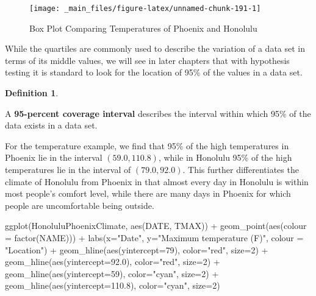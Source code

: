 \documentclass[
]{book}
\newenvironment{Shaded}{\begin{snugshade}}{\end{snugshade}}
\newcommand{\AttributeTok}[1]{\textcolor[rgb]{0.77,0.63,0.00}{#1}}
\newcommand{\DecValTok}[1]{\textcolor[rgb]{0.00,0.00,0.81}{#1}}
\newcommand{\FloatTok}[1]{\textcolor[rgb]{0.00,0.00,0.81}{#1}}
\newcommand{\FunctionTok}[1]{\textcolor[rgb]{0.00,0.00,0.00}{#1}}
\newcommand{\NormalTok}[1]{#1}
\newcommand{\SpecialCharTok}[1]{\textcolor[rgb]{0.00,0.00,0.00}{#1}}
\newcommand{\StringTok}[1]{\textcolor[rgb]{0.31,0.60,0.02}{#1}}
\theoremstyle{definition}
\newtheorem{definition}{Definition}[chapter]
\theoremstyle{definition}
\theoremstyle{definition}
\theoremstyle{definition}
\theoremstyle{remark}
\begin{document}
\begin{figure}

{\centering \texttt{[image: \_main\_files/figure-latex/unnamed-chunk-191-1]} 

}

\caption{Box Plot Comparing Temperatures of Phoenix and Honolulu}\label{fig:unnamed-chunk-191}
\end{figure}

While the quartiles are commonly used to describe the variation of a data set in terms of its middle values, we will see in later chapters that with hypothesis testing it is standard to look for the location of 95\% of the values in a data set.

\begin{definition}
\protect\hypertarget{def:unlabeled-div-299}{}\label{def:unlabeled-div-299}

A \textbf{95-percent coverage interval} describes the interval within which 95\% of the data exists in a data set.

\end{definition}

For the temperature example, we find that 95\% of the high temperatures in Phoenix lie in the interval \((59.0, 110.8)\), while in Honolulu 95\% of the high temperatures lie in the interval of \((79.0,92.0)\). This further differentiates the climate of Honolulu from Phoenix in that almost every day in Honolulu is within most people's comfort level, while there are many days in Phoenix for which people are uncomfortable being outside.

\begin{Shaded}
\begin{Highlighting}[]
\FunctionTok{ggplot}\NormalTok{(HonoluluPhoenixClimate, }\FunctionTok{aes}\NormalTok{(DATE, TMAX)) }\SpecialCharTok{+} \FunctionTok{geom\_point}\NormalTok{(}\FunctionTok{aes}\NormalTok{(}\AttributeTok{colour =} \FunctionTok{factor}\NormalTok{(NAME))) }\SpecialCharTok{+} \FunctionTok{labs}\NormalTok{(}\AttributeTok{x=}\StringTok{"Date"}\NormalTok{, }\AttributeTok{y=}\StringTok{"Maximum temperature (F)"}\NormalTok{, }\AttributeTok{colour =} \StringTok{"Location"}\NormalTok{) }\SpecialCharTok{+} \FunctionTok{geom\_hline}\NormalTok{(}\FunctionTok{aes}\NormalTok{(}\AttributeTok{yintercept=}\DecValTok{79}\NormalTok{), }\AttributeTok{color=}\StringTok{"red"}\NormalTok{, }\AttributeTok{size=}\DecValTok{2}\NormalTok{) }\SpecialCharTok{+} \FunctionTok{geom\_hline}\NormalTok{(}\FunctionTok{aes}\NormalTok{(}\AttributeTok{yintercept=}\FloatTok{92.0}\NormalTok{), }\AttributeTok{color=}\StringTok{"red"}\NormalTok{, }\AttributeTok{size=}\DecValTok{2}\NormalTok{) }\SpecialCharTok{+} \FunctionTok{geom\_hline}\NormalTok{(}\FunctionTok{aes}\NormalTok{(}\AttributeTok{yintercept=}\DecValTok{59}\NormalTok{), }\AttributeTok{color=}\StringTok{"cyan"}\NormalTok{, }\AttributeTok{size=}\DecValTok{2}\NormalTok{) }\SpecialCharTok{+} \FunctionTok{geom\_hline}\NormalTok{(}\FunctionTok{aes}\NormalTok{(}\AttributeTok{yintercept=}\FloatTok{110.8}\NormalTok{), }\AttributeTok{color=}\StringTok{"cyan"}\NormalTok{, }\AttributeTok{size=}\DecValTok{2}\NormalTok{)}
\end{Highlighting}
\end{Shaded}
\end{document}
